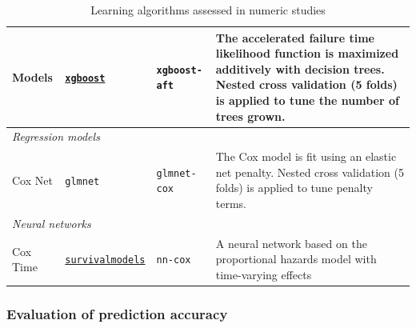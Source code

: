 \documentclass[twoside,11pt]{article}\usepackage[]{graphicx}\usepackage[]{xcolor}
\begin{document}
\begin{landscape}
\begin{table}[h!]
\begin{tabular}{p{2cm} | p{3cm} p{4cm} p{12cm}}
 Models & \href{https://xgboost.readthedocs.io/en/stable/#}{\texttt{xgboost}} & \texttt{xgboost-aft} & The accelerated failure time likelihood function is maximized additively with decision trees. Nested cross validation (5 folds) is applied to tune the number of trees grown.  \\
 \hline\hline
 \multicolumn{3}{l}{\textit{Regression models}}\\
 \hline\hline
 Cox Net & \texttt{glmnet} & \texttt{glmnet-cox} & The Cox model is fit using an elastic net penalty. Nested cross validation (5 folds) is applied to tune penalty terms.\\
 \hline\hline
 \multicolumn{3}{l}{\textit{Neural networks}}\\
 \hline\hline
 Cox Time & \href{https://raphaels1.github.io/survivalmodels/}{\texttt{survivalmodels}} & \texttt{nn-cox} & A neural network based on the proportional hazards model with time-varying effects  \\
 \hline
\end{tabular}
\caption{Learning algorithms assessed in numeric studies}
\label{table:learners}
\end{table}

\end{landscape}
\restoregeometry


\subsubsection{Evaluation of prediction accuracy} \label{sec:prediction_accuracy}
\end{document}
